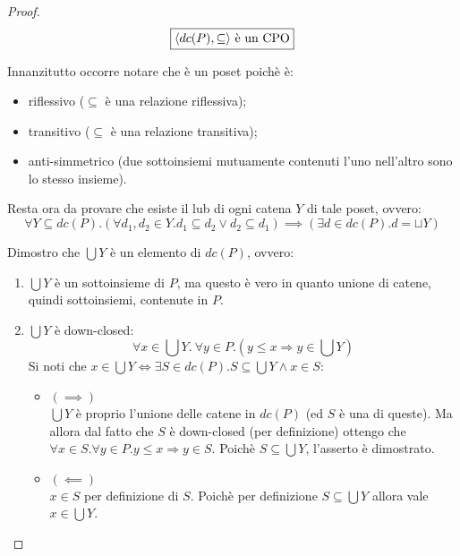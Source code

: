 \begin{proof}

$$
\boxed{\text{\ensuremath{\langle{}dc(P), \subseteq\rangle{}} è un CPO}}
$$

Innanzitutto occorre notare che  è un poset poichè è:

\begin{itemize}
  \item riflessivo ($\subseteq$ è una relazione riflessiva);
  \item transitivo ($\subseteq$ è una relazione transitiva);
  \item anti-simmetrico (due sottoinsiemi mutuamente contenuti l'uno nell'altro
    sono lo stesso insieme).
\end{itemize}

Resta ora da provare che esiste il lub di ogni catena $Y$ di tale poset, ovvero:
$$
\forall{Y}\subseteq dc(P).
          (\forall{d_1,d_2}\in Y.d_1 \subseteq d_2 \lor d_2 \subseteq d_1)
              \implies
          (\exists{d}\in dc(P). d = \sqcup Y)
$$

Dimostro che $\bigcup Y$ è un elemento di $dc(P)$, ovvero:
\begin{enumerate}
	\item $\bigcup Y$ è un sottoinsieme di $P$, ma questo è vero in quanto 
unione di catene, quindi sottoinsiemi, contenute in $P$.
	\item $\bigcup Y$ è down-closed:
	$$
	\forall x \in \bigcup Y.\ \forall y \in P.(y \leq x \Rightarrow y \in \bigcup Y)
	$$
	Si noti che
	$x \in \bigcup Y \iff \exists S \in dc(P).
		S \subseteq \bigcup Y \land x \in S$:
	\begin{itemize}
          \item $(\implies)$ \\
            $\bigcup Y$ è proprio l'unione delle catene in $dc(P)$ (ed $S$ è una
            di queste). Ma allora dal fatto che $S$ è down-closed 
            (per definizione) ottengo che 
            $\forall x \in S.\forall y \in P. y \leq x \Rightarrow y \in S$.
            Poichè $S \subseteq \bigcup Y$, l'asserto è dimostrato.
          \item $(\impliedby)$ \\
            $x \in S$ per definizione di $S$. Poichè per definizione
            $S \subseteq \bigcup Y$ allora vale $x \in \bigcup Y$.
        \end{itemize}
	\end{enumerate}



\end{proof}
